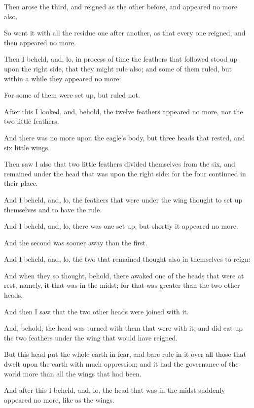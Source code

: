 {\par }{\PP {}Then arose the third, and reigned as the other before, and appeared no more also.
\par }{\PP {}So went it with all the residue one after another, as that every one reigned, and then appeared no more.
\par }{\PP {}Then I beheld, and, lo, in process of time the feathers that followed stood up upon the right side, that they might rule also; and some of them ruled, but within a while they appeared no more:
\par }{\PP {}For some of them were set up, but ruled not.
\par }{\PP {}After this I looked, and, behold, the twelve feathers appeared no more, nor the two little feathers:
\par }{\PP {}And there was no more upon the eagle’s body, but three heads that rested, and six little wings.
\par }{\PP {}Then saw I also that two little feathers divided themselves from the six, and remained under the head that was upon the right side: for the four continued in their place.
\par }{\PP {}And I beheld, and, lo, the feathers that were under the wing thought to set up themselves and to have the rule.
\par }{\PP {}And I beheld, and, lo, there was one set up, but shortly it appeared no more.
\par }{\PP {}And the second was sooner away than the first.
\par }{\PP {}And I beheld, and, lo, the two that remained thought also in themselves to reign:
\par }{\PP {}And when they so thought, behold, there awaked one of the heads that were at rest, namely, it that was in the midst; for that was greater than the two other heads.
\par }{\PP {}And then I saw that the two other heads were joined with it.
\par }{\PP {}And, behold, the head was turned with them that were with it, and did eat up the two feathers under the wing that would have reigned.
\par }{\PP {}But this head put the whole earth in fear, and bare rule in it over all those that dwelt upon the earth with much oppression; and it had the governance of the world more than all the wings that had been.
\par }{\PP {}And after this I beheld, and, lo, the head that was in the midst suddenly appeared no more, like as the wings.
}
